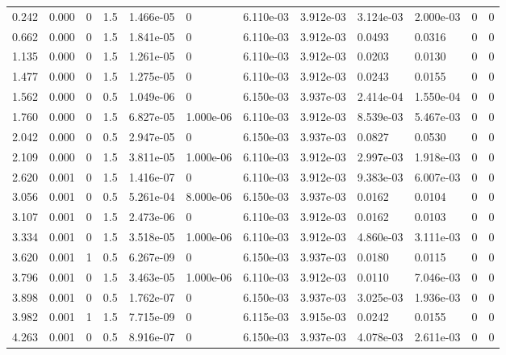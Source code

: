 \documentclass[preview]{standalone}
\begin{document}
{{\begin{tabular}{L{1.2cm}C{1.2cm} C{0.3cm}C{0.5cm} C{1.4cm}C{1.4cm} C{1.4cm}C{1.4cm} C{1.6cm}C{1.6cm} C{1.6cm}C{1.6cm}}
  0.242  &  0.000  & 0     & 1.5 &  1.466e-05  & 0  &  6.110e-03&   3.912e-03& 3.124e-03 & 2.000e-03   &  0 & 0  \\ 
  0.662  &  0.000  & 0     & 1.5 &  1.841e-05  & 0  &  6.110e-03&   3.912e-03& 0.0493 & 0.0316   &  0 & 0  \\ 
  1.135  &  0.000  & 0     & 1.5 &  1.261e-05  & 0  &  6.110e-03&   3.912e-03& 0.0203 & 0.0130   &  0 & 0  \\ 
  1.477  &  0.000  & 0     & 1.5 &  1.275e-05  & 0  &  6.110e-03&   3.912e-03& 0.0243 & 0.0155   &  0 & 0  \\ 
  1.562  &  0.000  & 0     & 0.5 &  1.049e-06  & 0  &  6.150e-03&   3.937e-03& 2.414e-04 & 1.550e-04   &  0 & 0  \\ 
  1.760  &  0.000  & 0     & 1.5 &  6.827e-05  & 1.000e-06  &  6.110e-03&   3.912e-03& 8.539e-03 & 5.467e-03   &  0 & 0  \\ 
  2.042  &  0.000  & 0     & 0.5 &  2.947e-05  & 0  &  6.150e-03&   3.937e-03& 0.0827 & 0.0530   &  0 & 0  \\ 
  2.109  &  0.000  & 0     & 1.5 &  3.811e-05  & 1.000e-06  &  6.110e-03&   3.912e-03& 2.997e-03 & 1.918e-03   &  0 & 0  \\ 
  2.620  &  0.001  & 0     & 1.5 &  1.416e-07  & 0  &  6.110e-03&   3.912e-03& 9.383e-03 & 6.007e-03   &  0 & 0  \\ 
  3.056  &  0.001  & 0     & 0.5 &  5.261e-04  & 8.000e-06  &  6.150e-03&   3.937e-03& 0.0162 & 0.0104   &  0 & 0  \\ 
  3.107  &  0.001  & 0     & 1.5 &  2.473e-06  & 0  &  6.110e-03&   3.912e-03& 0.0162 & 0.0103   &  0 & 0  \\ 
  3.334  &  0.001  & 0     & 1.5 &  3.518e-05  & 1.000e-06  &  6.110e-03&   3.912e-03& 4.860e-03 & 3.111e-03   &  0 & 0  \\ 
  3.620  &  0.001  & 1     & 0.5 &  6.267e-09  & 0  &  6.150e-03&   3.937e-03& 0.0180 & 0.0115   &  0 & 0  \\ 
  3.796  &  0.001  & 0     & 1.5 &  3.463e-05  & 1.000e-06  &  6.110e-03&   3.912e-03& 0.0110 & 7.046e-03   &  0 & 0  \\ 
  3.898  &  0.001  & 0     & 0.5 &  1.762e-07  & 0  &  6.150e-03&   3.937e-03& 3.025e-03 & 1.936e-03   &  0 & 0  \\ 
  3.982  &  0.001  & 1     & 1.5 &  7.715e-09  & 0  &  6.115e-03&   3.915e-03& 0.0242 & 0.0155   &  0 & 0  \\ 
  4.263  &  0.001  & 0     & 0.5 &  8.916e-07  & 0  &  6.150e-03&   3.937e-03& 4.078e-03 & 2.611e-03   &  0 & 0  \\ 

\end{tabular}}}
\end{document}
